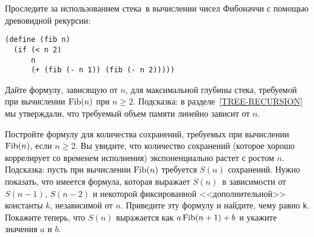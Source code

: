 \begin{exercise}{5.29}%
\label{EX5.29}%
Проследите за использованием стека~в вычислении чисел
Фибоначчи с помощью древовидной рекурсии:

\begin{Verbatim}[fontsize=\small]
(define (fib n)
  (if (< n 2)
      n
      (+ (fib (- n 1)) (fib (- n 2)))))
\end{Verbatim}

\begin{plainenum}


\item
Дайте формулу, зависящую от $n$, для
максимальной глубины стека,
требуемой при вычислении
$\mathop{\rm Fib}(n)$ при $n \ge 2$.  Подсказка: в
разделе~\ref{TREE-RECURSION} мы утверждали, что требуемый
объем памяти линейно зависит от $n$.

\item
Постройте формулу для количества сохранений,
требуемых при вычислении $\mathop{\rm Fib}(n)$, если $n \ge
2$.  Вы увидите, что количество сохранений (которое хорошо
коррелирует со временем исполнения) экспоненциально растет с ростом
$n$.  Подсказка: пусть при вычислении
$\mathop{\rm Fib}(n)$ требуется $S(n)$
сохранений.  Нужно показать, что имеется формула, которая выражает
$S(n)$~в зависимости от $S(n-1)$,
$S(n-2)$ и некоторой фиксированной <<дополнительной>>
константы $k$, независимой от $n$.  Приведите
эту формулу и найдите, чему равно {\tt k}.  Покажите теперь,
что $S(n)$ выражается как $a\mathop{\rm Fib}(n+1) + b$
и укажите значения $a$ и $b$.
{\sloppy

}
\end{plainenum}
\end{exercise}
